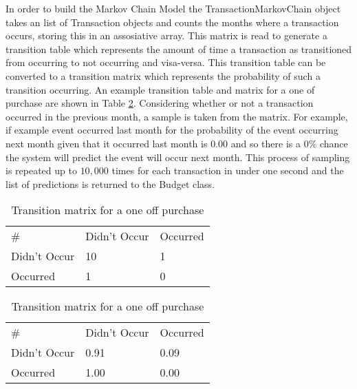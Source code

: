 In order to build the Markov Chain Model the TransactionMarkovChain object takes an list of Transaction objects and counts the months where a transaction occurs, storing this in an assosiative array. This matrix is read to generate a transition table which represents the amount of time a transaction as transitioned from occurring to not occurring and visa-versa. This transition table can be converted to a transition matrix which represents the probability of such a transition occurring. An example transition table and matrix for a one of purchase are shown in Table \ref{fig:transition-matrix}.
%
Considering whether or not a transaction occurred in the previous month, a sample is taken from the matrix. For example, if example event occurred last month for the probability of the event occurring next month given that it occurred last month is $0.00$ and so there is a 0\% chance the system will predict the event will occur next month. This process of sampling is repeated up to $10,000$ times for each transaction in under one second and the list of predictions is returned to the Budget class.

\begin{table}[!htb]

    \begin{minipage}{.5\linewidth}
      \centering
        \begin{tabular}{lll}
        \#           & Didn't Occur & Occurred \\
        Didn't Occur & 10           & 1       \\
        Occurred     & 1            & 0      
        \end{tabular}
        \caption{Transition table for a one off purchase}
    \end{minipage} 

    \begin{minipage}{.5\linewidth}
      \centering
        \begin{tabular}{lll}
        \#           & Didn't Occur & Occurred \\
        Didn't Occur & 0.91         & 0.09       \\
        Occurred     & 1.00         & 0.00     
        \end{tabular}
        \caption{Transition matrix for a one off purchase}
    \end{minipage}
    
    \label{fig:transition-matrix}
    
\end{table}

